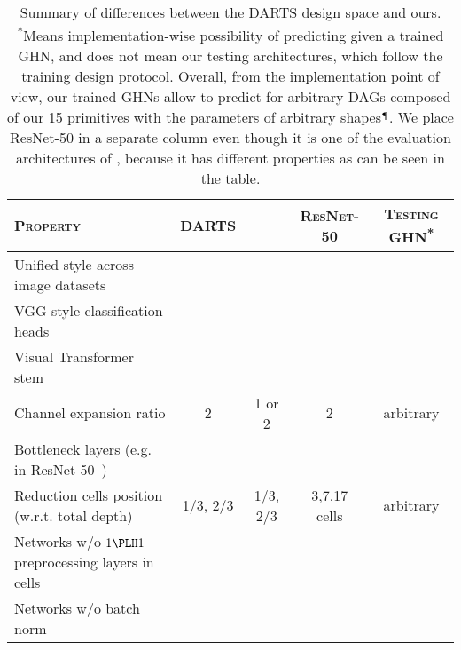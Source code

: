\begin{table}[thbp]
	\centering
	\caption{\small Summary of differences between the DARTS design space and ours. \textsuperscript{*}Means implementation-wise possibility of predicting \params given a trained GHN, and does not mean our testing \iid architectures, which follow the training design protocol. Overall, from the implementation point of view, our trained GHNs allow to predict \params for arbitrary DAGs composed of our 15 primitives with the parameters of arbitrary shapes$^{\mathparagraph}$. We place ResNet-50 in a separate column even though it is one of the evaluation architectures of \dataset, because it has different properties as can be seen in the table.}
	\label{tab:darts_diff}
	\vspace{3pt}
	\setlength{\tabcolsep}{2.5pt}
	\small
	\begin{tabular}{lcccc}
		\toprule
		
		\textbf{\textsc{Property}} & \textbf{\textsc{DARTS}} & \textbf{\textsc{\dataset}} & \textbf{\textsc{ResNet-50}} & \textbf{\textsc{Testing GHN}}\textsuperscript{*} \\
		\midrule
		
		Unified style across image datasets & \xmark & \cmark & \xmark & \cmark \\
		
		VGG style classification heads~\cite{simonyan2014very} & \xmark & \cmark & \xmark & \cmark \\
		
		Visual Transformer stem~\cite{dosovitskiy2020image} & \xmark & \cmark & \xmark & \cmark \\
		
		Channel expansion ratio & 2 & 1 or 2 & 2 & arbitrary \\
		
		Bottleneck layers (e.g. in ResNet-50~\cite{he2016deep}) & \xmark & \xmark & \cmark & \cmark \\
		
		Reduction cells position (w.r.t. total depth) & 1/3, 2/3 & 1/3, 2/3 & 3,7,17 cells & arbitrary \\
		
		Networks w/o $1\PLH 1$ preprocessing layers in cells & \xmark & \cmark & \cmark & \cmark \\
		
		Networks w/o batch norm & \xmark & \cmark & \xmark & \cmark \\
		
		\bottomrule
	\end{tabular}
\end{table}

